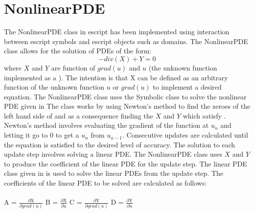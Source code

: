 \section{NonlinearPDE}
The NonlinearPDE class in escript has been implemented using interaction between escript symbols and escript objects such as domains. The NonlinearPDE class allows for the solution of PDEs of the form:
\begin{equation}
-div(X) + Y = 0
\label{symbolic eq1}
\end{equation}
where $X$ and $Y$ are function of $grad(u)$ and $u$ (the unknown function implemented as a \SYMBOL).
The intention is that X can be defined as an arbitrary function of the unknown function $u$ or $grad(u)$ to implement a desired equation.
The NonlinearPDE class uses the Symbolic class to solve the nonlinear PDE given in 
The class works by using Newton's method to find the zeroes of the left hand side of  and as a consequence finding the
$X$ and $Y$ which satisfy . 
Newton's method involves evaluating the gradient of the function at $u_n$ and letting it go to 0 to get a $u_n$ from $u_{n-1}$. Consecutive updates are calculated until the equation is
satisfied to the desired level of accuracy. The solution to each update step involves solving a linear PDE. The NonlinearPDE class uses $X$ and $Y$ to produce the coefficient of the linear PDE for the update step. The linear PDE class given in  is used to solve the linear PDEs from the update step. The coefficients of the linear PDE to be solved are calculated as follows: \\\\
{
\centering 
 A = $\frac{\partial \text{X}}{\partial grad(u)}$   B = $\frac{\partial \text{X}}{\partial u}$   C = $\frac{\partial \text{Y}}{\partial grad(u)}$    D = $\frac{\partial \text{Y}}{\partial u}$
}
